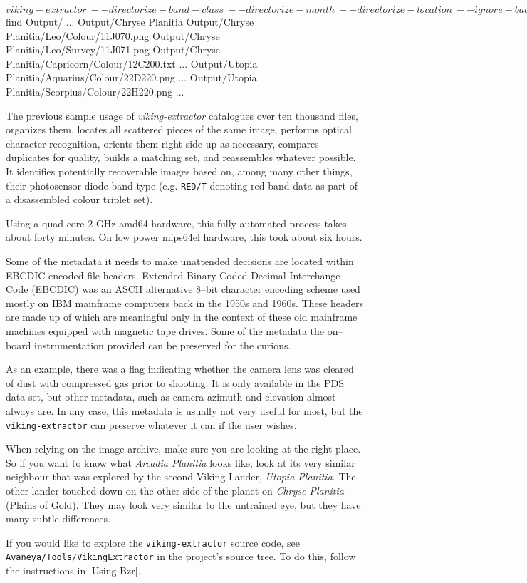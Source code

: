 \startCodeExample
$ viking-extractor              \
    --directorize-band-class    \
    --directorize-month         \
    --directorize-location      \
    --ignore-bad-files          \
    --interlace                 \
    --recursive                 \
    --save-metadata             \
    --summarize-only            \
     Processed\ Images          \
     Output

$ find Output/
...
Output/Chryse Planitia
Output/Chryse Planitia/Leo/Colour/11J070.png
Output/Chryse Planitia/Leo/Survey/11J071.png
Output/Chryse Planitia/Capricorn/Colour/12C200.txt
...
Output/Utopia Planitia/Aquarius/Colour/22D220.png
...
Output/Utopia Planitia/Scorpius/Colour/22H220.png
...
\stopCodeExample

The previous sample usage of {\it viking-extractor} catalogues over ten thousand files, organizes them, locates all scattered pieces of the same image, performs optical character recognition, orients them right side up as necessary, compares duplicates for quality, builds a matching set, and reassembles whatever possible. It identifies potentially recoverable images based on, among many other things, their photosensor diode band type (e.g. {\tt RED/T} denoting red band data as part of a disassembled colour triplet set). 

Using a quad core 2 GHz amd64 hardware, this fully automated process takes about forty minutes. On low power mips64el hardware, this took about six hours.

Some of the metadata it needs to make unattended decisions are located within EBCDIC encoded file headers. Extended Binary Coded Decimal Interchange Code (EBCDIC) was an ASCII alternative 8--bit character encoding scheme used mostly on IBM mainframe computers back in the 1950s and 1960s. These headers are made up of  which are meaningful only in the context of these old mainframe machines equipped with magnetic tape drives. Some of the metadata the on--board instrumentation provided can be preserved for the curious. 

As an example, there was a flag indicating whether the camera lens was cleared of dust with compressed gas prior to shooting. It is only available in the PDS data set, but other metadata, such as camera azimuth and elevation almost always are. In any case, this metadata is usually not very useful for most, but the {\tt viking-extractor} can preserve whatever it can if the user wishes.

When relying on the image archive, make sure you are looking at the right place. So if you want to know what {\it Arcadia Planitia} looks like, look at its very similar neighbour that was explored by the second Viking Lander, {\it Utopia Planitia}. The other lander touched down on the other side of the planet on {\it Chryse Planitia} (Plains of Gold). They may look very similar to the untrained eye, but they have many subtle differences.

If you would like to explore the {\tt viking-extractor} source code, see {\tt Avaneya/Tools/VikingExtractor} in the project's source tree. To do this, follow the instructions in \in{section}[Using Bzr].

\StopChapter

